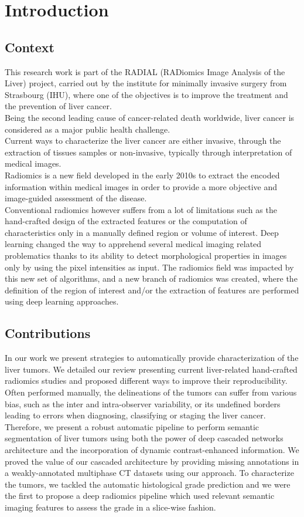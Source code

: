 \chapter{Introduction}

\section{Context}
This research work is part of the RADIAL (RADiomics Image Analysis of the Liver) project, carried out by the
institute for minimally invasive surgery from Strasbourg (IHU), where
one of the objectives is to improve the treatment and the prevention of
liver cancer.\\
Being the second leading cause of cancer-related death worldwide, liver
cancer is considered as a major public health challenge.\\
Current ways to characterize the liver cancer are either invasive, 
through the extraction of tissues samples or non-invasive, typically 
through interpretation of medical images.\\
Radiomics is a new field developed in the early 2010s to extract the encoded information within medical images in order to provide a more objective and image-guided assessment of the disease.\\
Conventional radiomics however suffers from a lot of limitations such as the hand-crafted design of the extracted features or the computation of characteristics only in a manually defined region or volume of interest. Deep learning changed the way to apprehend several medical imaging related problematics thanks to its ability to detect
morphological properties in images only by using the pixel intensities
as input. The radiomics field was impacted by this new set of algorithms, and a new branch of radiomics was created, where the definition of the region of interest and/or the extraction of features are performed using deep learning approaches.

\section{Contributions}
In our work we present strategies to automatically provide characterization of the liver tumors.
We detailed our review presenting current liver-related hand-crafted radiomics studies and proposed different ways to improve their reproducibility.
Often performed manually, the delineations of the tumors can suffer from various bias, such as the inter and intra-observer variability, or its undefined borders leading to errors when diagnosing, classifying or staging the liver cancer. Therefore, we present a robust automatic pipeline to perform semantic segmentation of liver tumors using both the power of deep cascaded networks architecture and the incorporation of dynamic contrast-enhanced information. We proved the value of our cascaded architecture by providing missing annotations in a weakly-annotated multiphase CT datasets using our approach.
To characterize the tumors, we tackled the automatic histological grade prediction and we were the first to propose a deep radiomics pipeline which used relevant semantic imaging features to assess the grade in a slice-wise fashion.

